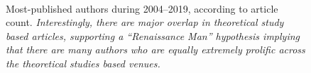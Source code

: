 \begin{figure}[!htpb]
	\begin{center}
	\\
	\end{center}
	\caption{Most-published authors during 2004--2019, according to article count. \textit{Interestingly, there are major overlap in theoretical study based articles, supporting a ``Renaissance Man'' hypothesis implying that there are many authors who are equally extremely prolific across the theoretical studies based venues.}}
	\label{fig:authors_top}
\end{figure}

